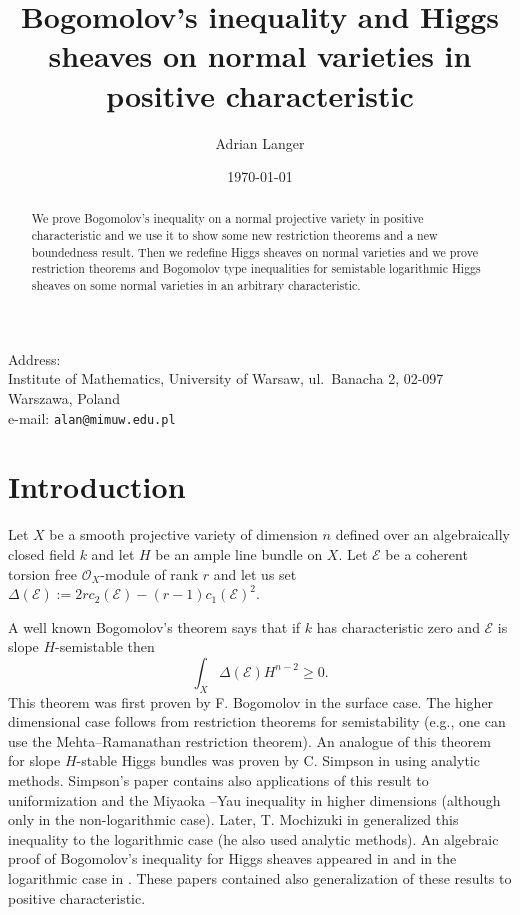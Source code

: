 \documentclass[12pt]{article}
\theoremstyle{plain}
\theoremstyle{definition}
\theoremstyle{remark}
\newcommand{\cE}{{\mathcal E}}
\newcommand{\cO}{{\mathcal O}}
\begin{document}
\markboth {\rm }{}



\title{Bogomolov's inequality and Higgs sheaves on normal varieties in positive characteristic}
\author{Adrian Langer} \date{\today}



\maketitle



{\noindent \sc Address:}\\
Institute of Mathematics, University of Warsaw,
ul.\ Banacha 2, 02-097 Warszawa, Poland\\
e-mail: {\tt alan@mimuw.edu.pl}


\medskip




\begin{abstract}
We prove Bogomolov's inequality on a normal projective  variety in positive characteristic and we use it to show some new restriction theorems and a new boundedness result. Then we redefine Higgs sheaves on normal varieties and we prove restriction theorems and Bogomolov type inequalities for semistable logarithmic Higgs sheaves on some normal varieties in an arbitrary characteristic. 
\end{abstract}





\section*{Introduction}

Let $X$ be a smooth projective variety of dimension $n$ defined over an algebraically closed field $k$  and let $H$ be an ample line bundle on $X$. Let $\cE$ be a coherent torsion free $\cO_X$-module of rank $r$ and let us set  $\Delta (\cE):=2r c_2 (\cE)-(r-1)c_1 (\cE)^2$.

A well known Bogomolov's theorem says that if $k$ has characteristic zero and  $\cE$ is slope $H$-semistable then 
$$\int_X \Delta (\cE) H^{n-2}\ge 0.$$
This theorem was first proven by F. Bogomolov in the surface case. The higher dimensional case  follows from restriction theorems for semistability (e.g., one can use the Mehta--Ramanathan restriction theorem).
An analogue of this theorem for slope $H$-stable Higgs bundles was proven by C. Simpson in \cite{Si} using analytic methods. Simpson's paper contains also  applications of this result to uniformization and the Miyaoka --Yau  inequality in higher dimensions (although only in the non-logarithmic case). 
Later, T. Mochizuki in \cite{Mo} generalized this inequality to the logarithmic case (he also used analytic methods). An algebraic proof of Bogomolov's inequality for Higgs sheaves 
appeared in \cite{La3} and in the logarithmic case in \cite{La4}. These papers contained also generalization of these results to positive characteristic.
\end{document}
